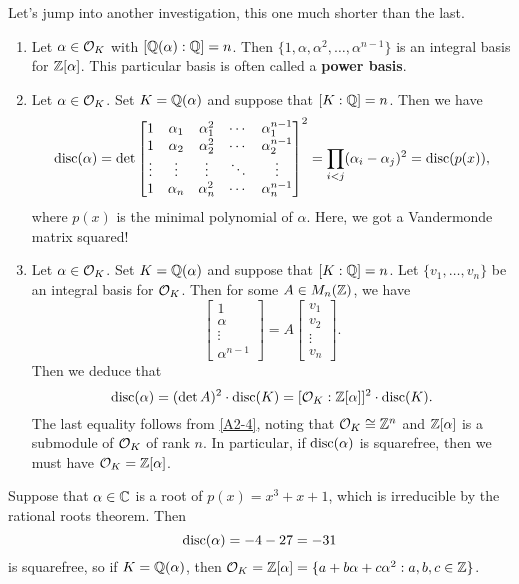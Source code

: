 Let's jump into another investigation, this one much shorter than the last. 
\begin{enumerate}[(1)]
    \item Let $\alpha \in {\cal O}_K$ with $[\mathbb{Q}(\alpha) : \mathbb{Q}] = n$. Then 
    $\{1, \alpha, \alpha^2, \dots, \alpha^{n-1}\}$ is an integral basis 
    for $\mathbb{Z}[\alpha]$. This particular basis is often called a 
    {\bf power basis}.

    \item Let $\alpha \in {\cal O}_K$. Set $K = \mathbb{Q}(\alpha)$ and suppose that
    $[K : \mathbb{Q}] = n$. Then we have 
    \[ \operatorname{disc}(\alpha) = \det\begin{bmatrix} 
        1 & \alpha_1 & \alpha_1^2 & \cdots & \alpha_1^{n-1} \\ 
        1 & \alpha_2 & \alpha_2^2 & \cdots & \alpha_2^{n-1} \\ 
        \vdots & \vdots & \vdots & \ddots & \vdots \\ 
        1 & \alpha_n & \alpha_n^2 & \cdots & \alpha_n^{n-1}
    \end{bmatrix}^2 = \prod_{i<j} (\alpha_i - \alpha_j)^2 = \operatorname{disc}(p(x)), \] 
    where $p(x)$ is the minimal polynomial of $\alpha$. Here, we got a 
    Vandermonde matrix squared!

    \item Let $\alpha \in {\cal O}_K$. Set $K = \mathbb{Q}(\alpha)$ and suppose that
    $[K : \mathbb{Q}] = n$. Let $\{v_1, \dots, v_n\}$ be an integral basis for 
    ${\cal O}_K$. Then for some $A \in M_n(\mathbb{Z})$, we have 
    \[ \begin{bmatrix} 1 \\ \alpha \\ \vdots \\ \alpha^{n-1} \end{bmatrix} 
    = A \begin{bmatrix} v_1 \\ v_2 \\ \vdots \\ v_n \end{bmatrix}. \] 
    Then we deduce that 
    \[ \operatorname{disc}(\alpha) = (\det A)^2 \cdot \operatorname{disc}(K) = [{\cal O}_K : 
    \mathbb{Z}[\alpha]]^2 \cdot \operatorname{disc}(K). \] 
    The last equality follows from \ref{A2-4}, noting that ${\cal O}_K
    \cong \mathbb{Z}^n$ and $\mathbb{Z}[\alpha]$ is a submodule of ${\cal O}_K$ of rank $n$. 
    In particular, if $\operatorname{disc}(\alpha)$ is squarefree, then we must have 
    ${\cal O}_K = \mathbb{Z}[\alpha]$. 
\end{enumerate}

Suppose that $\alpha \in \mathbb{C}$ is a root of $p(x) = x^3 + x + 1$, which is 
irreducible by the rational roots theorem. Then 
\[ \operatorname{disc}(\alpha) = -4 - 27 = -31 \] 
is squarefree, so if $K = \mathbb{Q}(\alpha)$, then ${\cal O}_K = \mathbb{Z}[\alpha] 
= \{a + b\alpha + c\alpha^2 : a, b, c \in \mathbb{Z}\}$.

